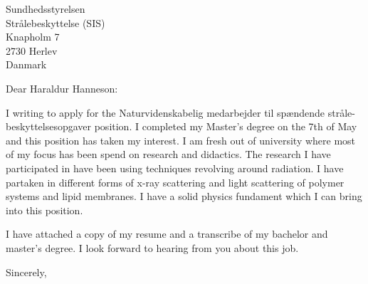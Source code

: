 \documentclass[10pt,a4paper]{letter}
\begin{document}
\begin{letter}{Sundhedsstyrelsen \\ Strålebeskyttelse (SIS) \\ Knapholm 7
\\ 2730 Herlev \\ Danmark}
\opening{Dear Haraldur Hanneson:}

I writing to apply for the Naturvidenskabelig medarbejder til spændende stråle-beskyttelsesopgaver position. I completed my Master's degree on the 7th of May and this position has taken my interest. I am fresh out of university where most of my focus has been spend on research and didactics. The research I have participated in have been using techniques revolving around radiation. I have partaken in different forms of x-ray scattering and light scattering of polymer systems and lipid membranes. I have a solid physics fundament which I can bring into this position. 

I have attached a copy of my resume and a transcribe of my bachelor and master's degree. I look forward to hearing from you about this job.   

\closing{Sincerely,}

\end{letter}
\end{document}

